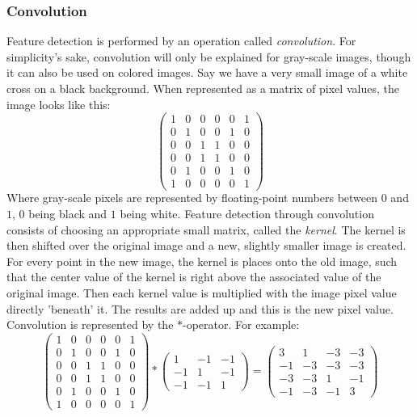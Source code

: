 \documentclass[12pt, titlepage]{article}
\begin{document}
		\subsubsection{Convolution} \label{convolution}
		Feature detection is performed by an operation called \textit{convolution}. For simplicity's sake, convolution will only be explained for gray-scale images, though it can also be used on colored images. Say we have a very small image of a white cross on a black background. When represented as a matrix of pixel values, the image looks like this:
		\begin{equation*}
		\begin{pmatrix}
		1 &0 &0 &0 &0 &1\\
		0 &1 &0 &0 &1 &0\\
		0 &0 &1 &1 &0 &0\\
		0 &0 &1 &1 &0 &0\\
		0 &1 &0 &0 &1 &0\\
		1 &0 &0 &0 &0 &1
		\end{pmatrix}
		\end{equation*}
		Where gray-scale pixels are represented by floating-point numbers between $0$ and $1$, $0$ being black and $1$ being white. Feature detection through convolution consists of choosing an appropriate small matrix, called the \textit{kernel}. The kernel is then shifted over the original image and a new, slightly smaller image is created. For every point in the new image, the kernel is places onto the old image, such that the center value of the kernel is right above the associated value of the original image. Then each kernel value is multiplied with the image pixel value directly 'beneath' it. The results are added up and this is the new pixel value. Convolution is represented by the $*$-operator. For example:
		\begin{equation*}
		\begin{pmatrix}
		1 &0 &0 &0 &0 &1\\
		0 &1 &0 &0 &1 &0\\
		0 &0 &1 &1 &0 &0\\
		0 &0 &1 &1 &0 &0\\
		0 &1 &0 &0 &1 &0\\
		1 &0 &0 &0 &0 &1
		\end{pmatrix} * \begin{pmatrix}
		1 &-1 &-1\\
		-1 &1 &-1\\
		-1 &-1 &1
		\end{pmatrix} = \begin{pmatrix}
		3 &1 &-3 &-3\\
		-1 & -3 & -3 &-3\\
		-3 &-3 &1 &-1\\
		-1 &-3 &-1 &3
		\end{pmatrix}
		\end{equation*}
\end{document}
